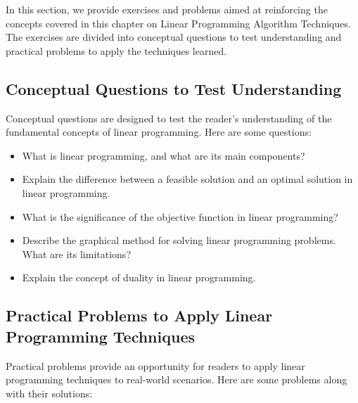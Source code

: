 \documentclass[12pt]{book} %
\begin{document}
In this section, we provide exercises and problems aimed at reinforcing the concepts covered in this chapter on Linear Programming Algorithm Techniques. The exercises are divided into conceptual questions to test understanding and practical problems to apply the techniques learned.

\subsection{Conceptual Questions to Test Understanding}

Conceptual questions are designed to test the reader's understanding of the fundamental concepts of linear programming. Here are some questions:

\begin{itemize}
    \item What is linear programming, and what are its main components?
    \item Explain the difference between a feasible solution and an optimal solution in linear programming.
    \item What is the significance of the objective function in linear programming?
    \item Describe the graphical method for solving linear programming problems. What are its limitations?
    \item Explain the concept of duality in linear programming.
\end{itemize}

\subsection{Practical Problems to Apply Linear Programming Techniques}

Practical problems provide an opportunity for readers to apply linear programming techniques to real-world scenarios. Here are some problems along with their solutions:
\end{document}
